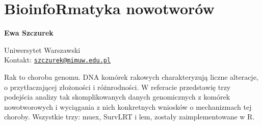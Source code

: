 \documentclass[\main/boa.tex]{subfiles}
\begin{document}
\section{BioinfoRmatyka nowotworów}


\begin{minipage}{0.915\textwidth}
	\centering
  {\bf \huge {} Ewa Szczurek}
\end{minipage}


\vskip 0.3cm

\begin{affiliations}
\begin{minipage}{0.915\textwidth}
\centering
\large Uniwersytet Warszawski  \\[5pt]
Kontakt: \href{mailto:szczurek@mimuw.edu.pl}{\nolinkurl{szczurek@mimuw.edu.pl}}\\
\end{minipage}
\end{affiliations}

\vskip 0.8cm

Rak to choroba genomu. DNA komórek rakowych charakteryzują liczne alteracje, o przytłaczającej złożoności i różnrodności. W referacie przedstawię trzy podejścia analizy tak skomplikowanych danych genomicznych z komórek nowotworowych i wyciągania z nich konkretnych wniosków o mechanizmach tej choroby. Wszystkie trzy: muex, SurvLRT i lem, zostały zaimplementowane w R. 
\end{document}
